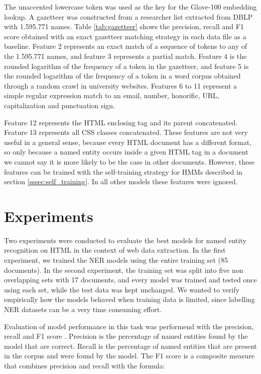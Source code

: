 \documentclass[sigconf]{acmart}
\begin{document}
The unaccented lowercase token was used as the key for the Glove-100 embedding lookup.
A gazetteer was constructed from a researcher list extracted from DBLP with 1.595.771
names. Table \ref{tab:gazetteer} shows the precision, recall and F1 score obtained with an
exact gazetteer matching strategy in each data file as a baseline.
Feature 2 represents an exact match of a sequence of tokens to any of the 1.595.771 
names, and feature 3 represents a partial match. Feature 4 is the rounded logarithm of 
the frequency of a token in the gazetteer, and feature 5 is the rounded logarithm of the frequency
of a token in a word corpus obtained through a random crawl in university websites.
Features 6 to 11 represent a simple regular expression match to an email, number, 
honorific, URL, capitalization and punctuation sign.

Feature 12 represents the HTML enclosing tag and its parent concatenated. Feature 13
represents all CSS classes concatenated. These features are not very useful in a general
sense, because every HTML document has a different format, so only because a named entity
occurs inside a given HTML tag in a document we cannot say it is more likely to be the case 
in other documents. However, these features can be trained with the self-training strategy 
for HMMs described in section \ref{sssec:self_training}. In all other models these features 
were ignored.

\section{Experiments}

Two experiments were conducted to evaluate the best models for named entity recognition
on HTML in the context of web data extraction. In the first experiment, we trained the NER models
using the entire training set (85 documents). In the second experiment, the training set was 
split into five non overlapping sets with 17 documents, and every model was trained
and tested once using each set, while the test data was kept unchanged. We wanted to verify empirically 
how the models behaved when training data is limited, since labelling NER datasets can be a
very time consuming effort.

Evaluation of model performance in this task was performend with the precision, recall and 
F1 score \cite{Rijsbergen1979}. Precision is the percentage of named entities found by 
the model that are correct. Recall is the percentage of named entities that are present
in the corpus and were found by the model. The F1 score is a composite measure that combines
precision and recall with the formula:
\end{document}
